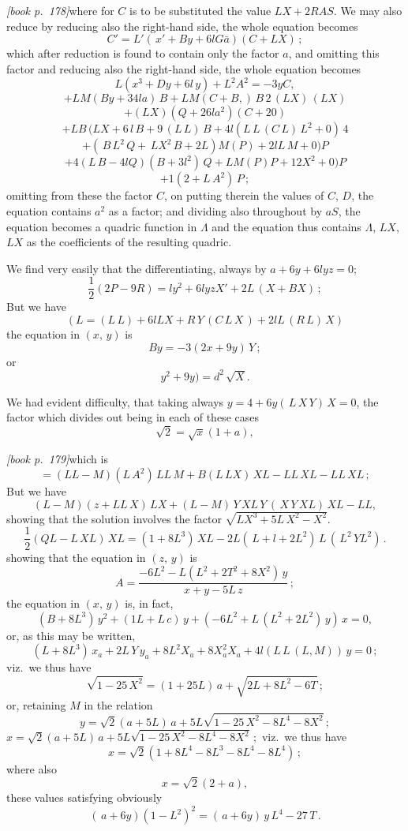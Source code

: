 \documentclass[11pt,a4paper]{article}
\begin{document}
\medskip\noindent\textit{[book p.~178]}\quad where for $C$ is to be substituted the value $LX + 2RAS$. We may also reduce by reducing also the right-hand side, the whole equation becomes
\[
C' = L'(\,x' + B y + 6lG\bar{a})(C + LX)\,;
\]
which after reduction is found to contain only the factor $a$, and omitting this factor and reducing also the right-hand side, the whole equation becomes
\[
L(x^3 + Dy + 6l\,y) + L^2 A^2 = -3yC,
\]
\[
+ L M (B y + 3 4l a)\,B + LM(C + B,)\,B \,2\,(LX)\,(LX)
\]
\[
+ (LX)(Q + 2 6la^2)(C + 2 0)
\]
\[
+ LB\,(LX + 6\,l\,B + 9\,(L\,L)\,B + 4l(L\,L\,(C\,L)\,L^2 + 0)\,4
\]
\[
+ (\,B\,L^2\,Q +\,LX^2\,B + 2L) M(P) + 2lL\,M + 0)P
\]
\[
+ 4(L\,B - 4lQ)(B + 3l^2)\,Q + LM(P)P + 12X^2 + 0)P
\]
\[
+ 1(2 + L\,A^2)\,P\,;
\]
omitting from these the factor $C$, on putting therein the values of $C$, $D$, the equation contains $a^2$ as a factor; and dividing also throughout by $aS$, the equation becomes a quadric function in $\Lambda$ and the equation thus contains $\Lambda$, $LX$, $LX$ as the coefficients of the resulting quadric.

We find very easily that the differentiating, always by $a + 6y + 6lyz = 0$;
\[
\frac{1}{2}(2P - 9R) = ly^2 + 6lyz X' + 2L\,(X + B X)\,;
\]
But we have
\[
(L = (L\,L) + 6lL X + R\,Y\,(C\,L\,X\,) + 2lL\,(R\,L)\,X)
\]
the equation in $(x,\,y)$ is
\[
By = -3(2x + 9y)\,Y\,;
\]
or
\[
y^2 + 9y) = d^2\,\sqrt{X}.
\]

We had evident difficulty, that taking always $y = 4 + 6y(\,L\,X\,Y)\,X = 0$, the factor which divides out being in each of these cases
\[
\sqrt{2} = \sqrt{x} (1 + a),
\]

\medskip\noindent\textit{[book p.~179]}\quad which is
\[
= (LL - M)(L\,A^2)\,LL\,M + B(L\,LX)\,XL - LL\,XL - LL\,XL\,;
\]
But we have
\[
(L - M)(z + LL\,X)\,LX + (L - M)\,Y\,XL\,Y\,(\,X\,Y\,XL)\,XL - LL,
\]
showing that the solution involves the factor $\sqrt{L X^3 + 5L\,X^2 - X^2}.$
\[
\frac{1}{2}(QL - L\,XL)\,XL = (1 + 8L^3)\,XL - 2L(\,L + l + 2L^2)\,L\,(\,L^2\,YL^2)\,.
\]
showing that the equation in $(z,\,y)$ is
\[
A = \frac{-6L^2 - L(L^2 + 2T^2 + 8X^2)\,y}{x + y - 5L\,z}\,;
\]
the equation in $(x,\,y)$ is, in fact,
\[
(B + 8L^3)\,y^2 + (1L + L\,c)\,y + (-6L^2 + L\,(L^2 + 2L^2)\,y)\,x = 0,
\]
or, as this may be written,
\[
(L + 8L^3)\,x_a + 2L\,Y\,y_a + 8L^2X_a + 8X_a^2X_a + 4l(L\,L\,(L,M))\,y = 0\,;
\]
viz.\ we thus have
\[
\sqrt{1 - 25\,X^2} = (1 + 25L)\,a + \sqrt{2L + 8L^2 - 6T}\,;
\]
or, retaining $M$ in the relation
\[
y = \sqrt{2}(a + 5L)\,a + 5L\sqrt{1 - 25\,X^2 - 8L^4 - 8X^2}\,;
\]
$x = \sqrt{2}(a + 5L)\,a + 5L\sqrt{1 - 25\,X^2 - 8L^4 - 8X^2}\,;$
viz.\ we thus have
\[
x = \sqrt{2}(1 + 8L^4 - 8L^3 - 8L^4 - 8L^4)\,;
\]
where also
\[
x = \sqrt{2}(2 + a),
\]
these values satisfying obviously
\[
(\,a + 6y)(1 - L^2)^2 = (\,a + 6y)\,y\,L^4 - 27\,T\,.
\]
\end{document}
